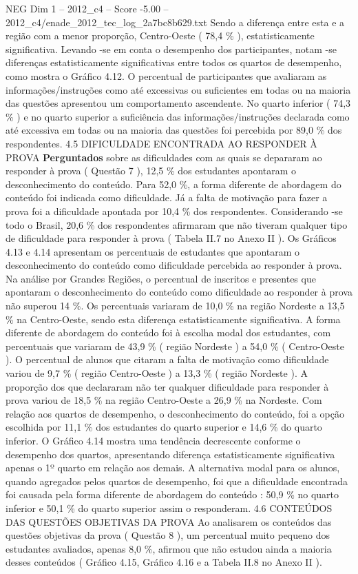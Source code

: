 \begin{textsample}{NEG Dim 1 – 2012\_c4 – Score -5.00 – 2012\_c4/enade\_2012\_tec\_log\_2a7bc8b629.txt}
Sendo a diferença entre esta e a região com a menor proporção, Centro-Oeste ( 78,4 \% ), estatisticamente significativa.
Levando -se em conta o desempenho dos participantes, notam -se diferenças estatisticamente significativas entre todos os quartos de desempenho, como mostra o Gráfico 4.12.
O percentual de participantes que avaliaram as informações/instruções como até excessivas ou suficientes em todas ou na maioria das questões apresentou um comportamento ascendente.
No quarto inferior ( 74,3 \% ) e no quarto superior a suficiência das informações/instruções declarada como até excessiva em todas ou na maioria das questões foi percebida por 89,0 \% dos respondentes. 4.5 DIFICULDADE ENCONTRADA AO RESPONDER À PROVA \textbf{Perguntados} sobre as dificuldades com as quais se depararam ao responder à prova ( Questão 7 ), 12,5 \% dos estudantes apontaram o desconhecimento do conteúdo.
Para 52,0 \%, a forma diferente de abordagem do conteúdo foi indicada como dificuldade.
Já a falta de motivação para fazer a prova foi a dificuldade apontada por 10,4 \% dos respondentes.
Considerando -se todo o Brasil, 20,6 \% dos respondentes afirmaram que não tiveram qualquer tipo de dificuldade para responder à prova ( Tabela II.7 no Anexo II ).
Os Gráficos 4.13 e 4.14 apresentam os percentuais de estudantes que apontaram o desconhecimento do conteúdo como dificuldade percebida ao responder à prova.
Na análise por Grandes Regiões, o percentual de inscritos e presentes que apontaram o desconhecimento do conteúdo como dificuldade ao responder à prova não superou 14 \%.
Os percentuais variaram de 10,0 \% na região Nordeste a 13,5 \% na Centro-Oeste, sendo esta diferença estatisticamente significativa.
A forma diferente de abordagem do conteúdo foi à escolha modal dos estudantes, com percentuais que variaram de 43,9 \% ( região Nordeste ) a 54,0 \% ( Centro-Oeste ).
O percentual de alunos que citaram a falta de motivação como dificuldade variou de 9,7 \% ( região Centro-Oeste ) a 13,3 \% ( região Nordeste ).
A proporção dos que declararam não ter qualquer dificuldade para responder à prova variou de 18,5 \% na região Centro-Oeste a 26,9 \% na Nordeste.
Com relação aos quartos de desempenho, o desconhecimento do conteúdo, foi a opção escolhida por 11,1 \% dos estudantes do quarto superior e 14,6 \% do quarto inferior.
O Gráfico 4.14 mostra uma tendência decrescente conforme o desempenho dos quartos, apresentando diferença estatisticamente significativa apenas o 1º quarto em relação aos demais.
A alternativa modal para os alunos, quando agregados pelos quartos de desempenho, foi que a dificuldade encontrada foi causada pela forma diferente de abordagem do conteúdo : 50,9 \% no quarto inferior e 50,1 \% do quarto superior assim o responderam. 4.6 CONTEÚDOS DAS QUESTÕES OBJETIVAS DA PROVA Ao analisarem os conteúdos das questões objetivas da prova ( Questão 8 ), um percentual muito pequeno dos estudantes avaliados, apenas 8,0 \%, afirmou que não estudou ainda a maioria desses conteúdos ( Gráfico 4.15, Gráfico 4.16 e a Tabela II.8 no Anexo II ).

\end{textsample}
